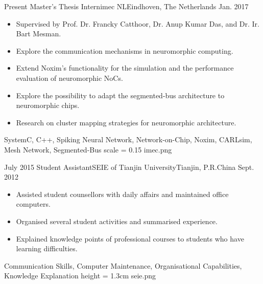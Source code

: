 %
%
%
%
%

\begin{experiences}
	\experience
    {Present}	{Master's Thesis Intern}{imec NL}{Eindhoven, The Netherlands}
    {Jan. 2017}	{
    				\begin{itemize}
                    	\item Supervised by Prof. Dr. Francky Catthoor, Dr. Anup Kumar Das, and Dr. Ir. Bart Mesman.
    					\item Explore the communication mechanisms in neuromorphic computing.
                        \item Extend Noxim's functionality for the simulation and the performance evaluation of neuromorphic NoCs.
                        \item Explore the possibility to adapt the segmented-bus architecture to neuromorphic chips. 
                        \item Research on cluster mapping strategies for neuromorphic architecture.
    				\end{itemize}
    			}
                {SystemC, C++, Spiking Neural Network, Network-on-Chip, Noxim, CARLsim, Mesh Network, Segmented-Bus}
     {scale = 0.15}		{imec.png} 
	\emptySeparator
    
    
    \experience
    {July 2015}	{Student Assistant}{SEIE of Tianjin University}{Tianjin, P.R.China}
    {Sept. 2012}	{
    				\begin{itemize}
                    	\item Assisted student counsellors with daily affairs and maintained office computers. 
    					\item Organised several student activities and summarised experience.
                        \item Explained knowledge points of professional courses to students who have learning difficulties.
    				\end{itemize}
    			}
                {Communication Skills, Computer Maintenance, Organisational Capabilities, Knowledge Explanation}
     {height = 1.3cm}		{seie.png} 
    
\end{experiences}